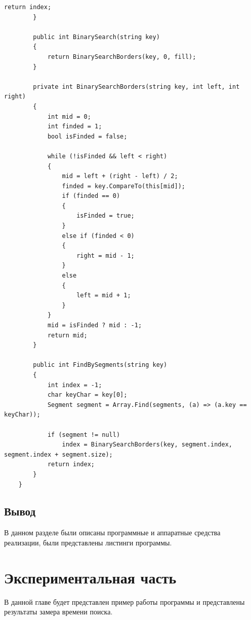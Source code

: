\documentclass{article}
\begin{document}
\begin{lstlisting}[label=dictLst,caption=Dictionary]
            return index;
        }

        public int BinarySearch(string key)
        {
            return BinarySearchBorders(key, 0, fill);
        }

        private int BinarySearchBorders(string key, int left, int right)
        {
            int mid = 0;
            int finded = 1;
            bool isFinded = false;

            while (!isFinded && left < right)
            {
                mid = left + (right - left) / 2;
                finded = key.CompareTo(this[mid]);
                if (finded == 0)
                {
                    isFinded = true;
                }
                else if (finded < 0)
                {
                    right = mid - 1;
                }
                else
                {
                    left = mid + 1;
                }
            }
            mid = isFinded ? mid : -1;
            return mid;
        }

        public int FindBySegments(string key)
        {
            int index = -1;
            char keyChar = key[0];
            Segment segment = Array.Find(segments, (a) => (a.key == keyChar));

            if (segment != null)
                index = BinarySearchBorders(key, segment.index, segment.index + segment.size);
            return index;
        }
    }
	\end{lstlisting}

	\subsection{Вывод}
	В данном разделе были описаны программные и аппаратные средства реализации, были представлены листинги программы.

	\newpage
	\section{Экспериментальная часть}
	В данной главе будет представлен пример работы программы и представлены результаты замера времени поиска.
\end{document}
